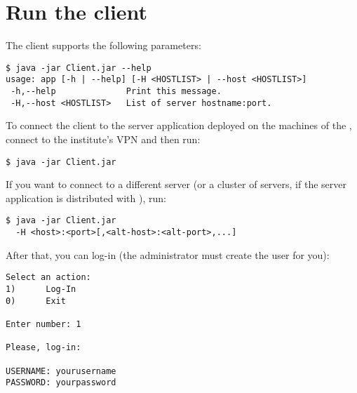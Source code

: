 \section{Run the client}

The client supports the following parameters:

\begin{verbatim}
$ java -jar Client.jar --help
usage: app [-h | --help] [-H <HOSTLIST> | --host <HOSTLIST>]
 -h,--help              Print this message.
 -H,--host <HOSTLIST>   List of server hostname:port.
\end{verbatim}

To connect the client to the server application deployed on the machines of the
\theinstitute, connect to the institute's VPN and then run:

\begin{verbatim}
$ java -jar Client.jar
\end{verbatim}

If you want to connect to a different server (or a cluster of servers, if the
server application is distributed with ), run:

\begin{verbatim}
$ java -jar Client.jar
  -H <host>:<port>[,<alt-host>:<alt-port>,...]
\end{verbatim}

After that, you can log-in (the administrator must create the user for you):

\begin{verbatim}
Select an action:
1)      Log-In
0)      Exit

Enter number: 1

Please, log-in:

USERNAME: yourusername
PASSWORD: yourpassword
\end{verbatim}
